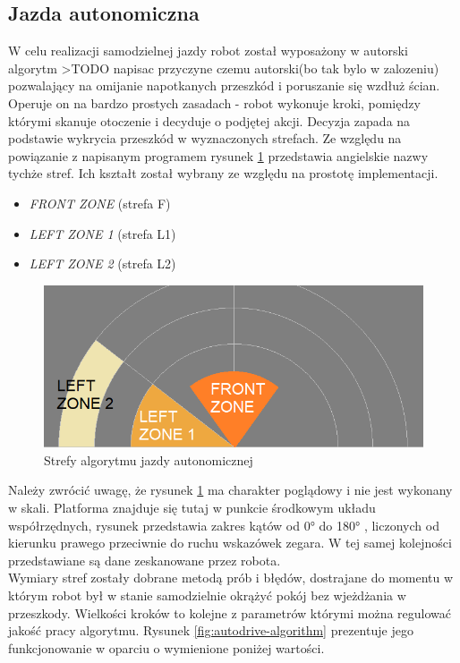 \subsection{Jazda autonomiczna}
\label{sec:autonomous-drive}
W celu realizacji samodzielnej jazdy robot został wyposażony w autorski algorytm >TODO napisac przyczyne czemu autorski(bo tak bylo w zalozeniu) pozwalający na omijanie napotkanych przeszkód i poruszanie się wzdłuż ścian. Operuje on na bardzo prostych zasadach - robot wykonuje kroki, pomiędzy którymi skanuje otoczenie i decyduje o podjętej akcji. Decyzja zapada na podstawie wykrycia przeszkód w wyznaczonych strefach. Ze względu na powiązanie z napisanym programem rysunek \ref{fig:autodrive-zones} przedstawia angielskie nazwy tychże stref. Ich kształt został wybrany ze względu na prostotę implementacji.
\begin{itemize}
    \item \emph{FRONT ZONE} (strefa F)
    \item \emph{LEFT ZONE 1} (strefa L1)
    \item \emph{LEFT ZONE 2} (strefa L2)
\end{itemize}

\begin{figure}[ht]
	\centering
		\includegraphics[width=1\linewidth]{rys/autodrive-zones.png}
	\caption{Strefy algorytmu jazdy autonomicznej}
	\label{fig:autodrive-zones}
\end{figure}

Należy zwrócić uwagę, że rysunek \ref{fig:autodrive-zones} ma charakter poglądowy i nie jest wykonany w skali. Platforma znajduje się tutaj w punkcie środkowym układu współrzędnych, rysunek przedstawia zakres kątów od 0° do 180° , liczonych od kierunku prawego przeciwnie do ruchu wskazówek zegara. W tej samej kolejności przedstawiane są dane zeskanowane przez robota.
\\
Wymiary stref zostały dobrane metodą prób i błędów, dostrajane do momentu w którym robot był w stanie samodzielnie okrążyć pokój bez wjeżdżania w przeszkody.
Wielkości kroków to kolejne z parametrów którymi można regulować jakość pracy algorytmu. Rysunek \ref{fig:autodrive-algorithm} prezentuje jego funkcjonowanie w oparciu o wymienione poniżej wartości.

